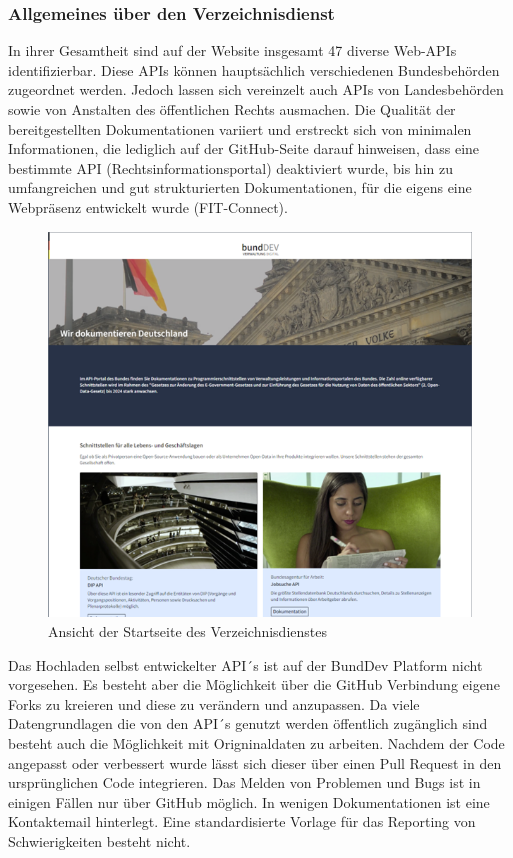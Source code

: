 \documentclass[notitlepage, hidelinks]{article}
\begin{document}
\subsubsection{Allgemeines über den Verzeichnisdienst}
In ihrer Gesamtheit sind auf der Website insgesamt 47 diverse Web-APIs identifizierbar. Diese APIs können hauptsächlich verschiedenen Bundesbehörden zugeordnet werden. Jedoch lassen sich vereinzelt auch APIs von Landesbehörden sowie von Anstalten des öffentlichen Rechts ausmachen. Die Qualität der bereitgestellten Dokumentationen variiert und erstreckt sich von minimalen Informationen, die lediglich auf der GitHub-Seite darauf hinweisen, dass eine bestimmte API (Rechtsinformationsportal) deaktiviert wurde, bis hin zu umfangreichen und gut strukturierten Dokumentationen, für die eigens eine Webpräsenz entwickelt wurde (FIT-Connect).

\begin{figure}[H]
\centering
  \includegraphics[width=\textwidth]{images/bundwebsite.png}
  \caption{Ansicht der Startseite des Verzeichnisdienstes}
  \label{fig:}
\end{figure}

Das Hochladen selbst entwickelter API´s ist auf der BundDev Platform nicht vorgesehen. Es besteht aber die Möglichkeit über die GitHub Verbindung eigene Forks zu kreieren und diese zu verändern und anzupassen. Da viele Datengrundlagen die von den API´s genutzt werden öffentlich zugänglich sind besteht auch die Möglichkeit mit Origninaldaten zu arbeiten. Nachdem der Code angepasst oder verbessert wurde lässt sich dieser über einen Pull Request in den ursprünglichen Code integrieren. 
Das Melden von Problemen und Bugs ist in einigen Fällen nur über GitHub möglich. In wenigen Dokumentationen ist eine Kontaktemail hinterlegt. Eine standardisierte Vorlage für das Reporting von Schwierigkeiten besteht nicht.
\end{document}
